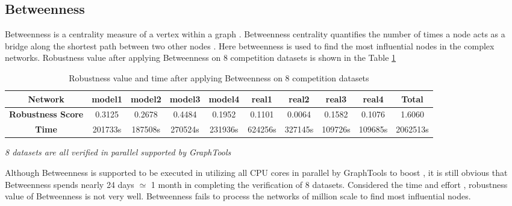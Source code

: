 \documentclass{article}
\begin{document}
	\subsection{Betweenness}
	
	Betweenness is a centrality measure of a vertex within a graph . Betweenness centrality quantifies the number of times a node acts as a bridge along the shortest path between two other nodes \cite{wikiBetweennesscentrality}\cite{freeman1977set}. Here betweenness is used to find the most influential nodes in the complex networks. Robustness value after applying Betweenness on 8 competition datasets is shown in the Table \ref{tab:table2}
	
	
\begin{table}[]
	\begin{adjustwidth}{-1.3cm}{}		
		\begin{threeparttable}
			\centering
			\caption{Robustness value and time after applying Betweenness on 8 competition datasets}
			\label{tab:table2}
		
			\begin{tabular}{|c|c|c|c|c|c|c|c|c|c|}
				\hline
				\textbf{Network}          & \textbf{model1} & \textbf{model2} & \textbf{model3} & \textbf{model4} & \textbf{real1} & \textbf{real2} & \textbf{real3} & \textbf{real4} & \textbf{Total} \\ \hline
				\textbf{Robustness Score} & 0.3125          & 0.2678          & 0.4484          & 0.1952          & 0.1101         & 0.0064         & 0.1582         & 0.1076         & 1.6060         \\ \hline
				\textbf{Time}     & 201733s          & 187508s          & 270524s          & 231936s         & 624256s         & 327145s         & 109726s         & 109685s         & 2062513s        \\ \hline
			\end{tabular}
				\begin{tablenotes}
					\small
					\item\textit{8 datasets are all verified in parallel supported by GraphTools \cite{peixotographtool2014}}
				\end{tablenotes}			
	 	\end{threeparttable}
	\end{adjustwidth}
\end{table}
	
	
	Although Betweenness is supported to be executed in utilizing all CPU cores in parallel by GraphTools \cite{peixotographtool2014} to boost , it is still obvious that Betweenness spends nearly 24 days $\simeq$ 1 month in completing the verification of 8 datasets. Considered the time and effort , robustness value of Betweenness is not very well. Betweenness fails to process the networks of million scale to find most influential nodes.
	
\end{document}
